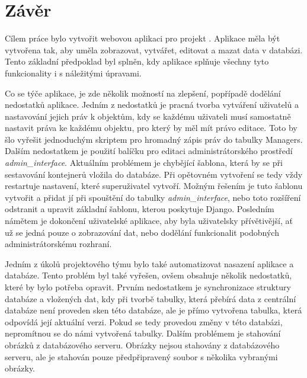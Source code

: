 \chapter*{Závěr}
\label{5-zaver}

Cílem práce bylo vytvořit webovou aplikaci pro projekt
. Aplikace měla být vytvořena tak, aby uměla zobrazovat,
vytvářet, editovat a mazat data v databázi. Tento základní předpoklad
byl splněn, kdy aplikace splňuje všechny tyto funkcion\-ality i s
náležitými úpravami.

Co se týče aplikace, je zde několik možností na zlepšení, popřípadě
dodělání nedostatků aplikace. Jedním z nedostatků je pracná tvorba
vytváření uživatelů a nastavování jejich práv k objektům, kdy se
každému uživateli musí samostatně nastavit práva ke každému objektu,
pro který by měl mít právo editace. Toto by šlo vyřešit jednoduchým
skriptem pro hromadný zápis práv do tabulky Managers. Dalším
nedostatkem je použití balíčku pro editaci administrátorského
prostředí \emph{admin\_interface}. Aktuálním problémem je chybějící šablona, která
by se při se\-stavování kontejnerů vložila do databáze. Při opětovném
vytvoření se tedy vždy restartuje nastavení, které superuživatel
vytvoří. Možným řešením je tuto šablonu vytvořit a přidat jí při
spouštění do tabulky \emph{admin\_interface}, nebo toto rozšíření odstranit a
upravit základní  šablonu, kterou poskytuje Django. Posledním
námětem je dokončení uživatelské aplikace, aby byla uživatelsky
přívětivější, ať už se jedná pouze o zobrazování dat, nebo dodělání
funkcionalit podobných admi\-nistrátorskému rozhraní.

Jedním z úkolů projektového týmu  bylo také automatizovat
nasazení aplikace a databáze. Tento problém byl také vyřešen, ovšem
obsahuje několik nedostatků, které by bylo potřeba opravit. Prvním
nedostatkem je synchronizace struktury databáze a vložených dat, kdy
při tvorbě tabulky, která přebírá data z centrální databáze není
proveden sken této databáze, ale je přímo vytvořena tabulka, která
odpovídá její aktuální verzi. Pokud se tedy provedou změny v této
databázi, nepromítnou se do námi vytvořená tabulky. Dalším problémem
je stahování obrázků z databázového serveru. Obrázky nejsou stahovány
z databázového serveru, ale je stahován pouze předpřipravený soubor s
několika vybranými obrázky.
